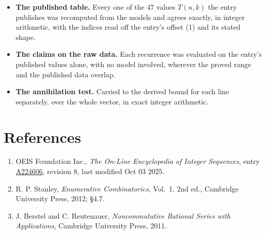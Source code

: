 \documentclass[11pt]{article}
\theoremstyle{definition}
\begin{document}
\begin{itemize}

\item {\bfseries The published table.} Every one of the 47 values $T(n,k)$ the entry publishes was recomputed from the models and agrees exactly, in integer arithmetic, with the indices read off the entry's offset (1) and its stated shape.

\item {\bfseries The claims on the raw data.} Each recurrence was evaluated on the entry's published values alone, with no model involved, wherever the proved range and the published data overlap.

\item {\bfseries The annihilation test.} Carried to the derived bound for each line separately, over the whole vector, in exact integer arithmetic.

\end{itemize}

\section{References}

\begin{enumerate}

\item OEIS Foundation Inc., \emph{The On-Line Encyclopedia of Integer Sequences}, entry \href{https://oeis.org/A224606}{A224606}, revision 8, last modified Oct 03 2025.

\item R. P. Stanley, \emph{Enumerative Combinatorics}, Vol.~1, 2nd ed., Cambridge University Press, 2012; \S4.7.

\item J. Berstel and C. Reutenauer, \emph{Noncommutative Rational Series with Applications}, Cambridge University Press, 2011.

\end{enumerate}
\end{document}
